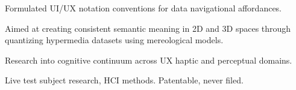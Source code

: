\documentclass[letterpaper]{deedy-resume} %
\begin{document}
\begin{minipage}[t]{1\textwidth}
\sectionspace %



\begin{tightitemize}
\item Formulated UI/UX notation conventions for data navigational affordances.
\item Aimed at creating consistent semantic meaning in 2D and 3D spaces through quantizing hypermedia datasets using mereological models.
\item Research into cognitive continuum across UX haptic and perceptual domains.
\item Live test subject research, HCI methods.  Patentable, never filed.
\end{tightitemize}

\sectionspace %





\end{minipage} %

\end{document}
